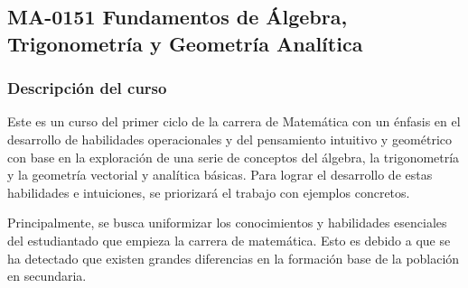 


\newpage 
\subsection*{MA-0151 Fundamentos de Álgebra, Trigonometría y Geometría Analítica}
\hypertarget{MA0151}{}
\begin{refsection}
\begin{table}[H]
\end{table}



\subsubsection*{Descripción del curso}

Este es un curso del primer ciclo de la carrera de Matemática con un énfasis en el desarrollo de habilidades operacionales y del pensamiento intuitivo y geométrico con base en la exploración de una serie de conceptos del álgebra, la trigonometría y la geometría vectorial y analítica básicas. Para lograr el desarrollo de estas habilidades e intuiciones, se priorizará el trabajo con ejemplos concretos.

Principalmente, se busca uniformizar los conocimientos y habilidades esenciales del estudiantado que empieza la carrera de matemática. Esto es debido a que se ha detectado que existen grandes diferencias en la formación base de la población en secundaria.


\end{refsection}
